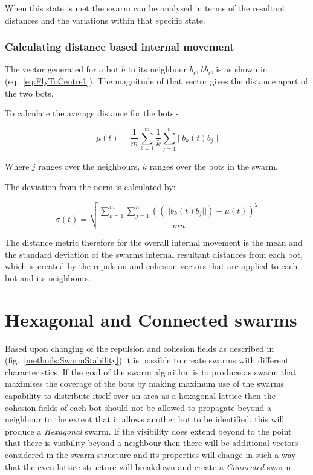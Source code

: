 \documentclass[10pt,journal,letterpaper,twoside]{IEEEtran}
\newcommand{\swarmA}{Hexagonal}
\newcommand{\swarmB}{Connected}
\newcommand{\stability}{internal movement}
\newcommand{\Fig}{fig.}
\newcommand{\Eq}{eq.}
\begin{document}
When this state is met the swarm can be analysed in terms of the
resultant distances and the variations within that specific state.

\subsubsection{Calculating distance based \stability{}}

The vector generated for a bot $b$ to its neighbour $b_i$, $bb_i$, is
as shown in (\Eq{}~\ref{eq:FlyToCentre1}). The magnitude of that
vector gives the distance apart of the two bots.

To calculate the average distance for the bots:-

\begin{equation}
\label{eq:SwarmStabilityDistance1}
\mu(t) = \frac{1}{m}{\sum_{k=1}^{m}}\frac{1}{k}{\sum_{j=1}^{n}||b_k(t)b_j||}
\end{equation}

Where $j$ ranges over the neighbours, $k$ ranges over the bots in the
swarm.

The deviation from the norm is calculated by:-

\begin{equation}
\label{eq:SwarmStabilityQuotientT}
\sigma(t) = \sqrt{\frac{\sum_{k=1}^{m}\sum_{j=1}^{n}((||b_k(t)b_j||)-\mu(t))^2}{mn}}
\end{equation}

The distance metric therefore for the overall \stability{} is the mean
and the standard deviation of the swarms internal resultant distances
from each bot, which is created by the repulsion and cohesion vectors
that are applied to each bot and its neighbours.

\section{\swarmA{} and \swarmB{} swarms\label{methods:SwarmTypesStability1}}

Based upon changing of the repulsion and cohesion fields as described
in (\Fig{}~\ref{methods:SwarmStability}) it is possible to create
swarms with different characteristics. If the goal of the swarm
algorithm is to produce as swarm that maximises the coverage of the
bots by making maximum use of the swarms capability to distribute
itself over an area as a hexagonal lattice then the cohesion fields of
each bot should not be allowed to propagate beyond a neighbour to the
extent that it allows another bot to be identified, this will produce
a \textit{\swarmA{}} swarm. If the visibility does extend beyond to
the point that there is visibility beyond a neighbour then there will
be additional vectors considered in the swarm structure and its
properties will change in such a way that the even lattice structure
will breakdown and create a \textit{\swarmB{}} swarm.
\end{document}
